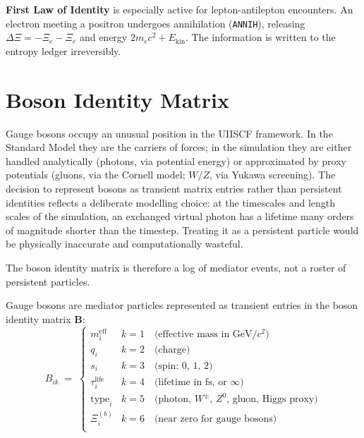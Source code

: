 \documentclass[11pt,a4paper]{article}
\newcommand{\Rec}{\Xi}
\begin{document}
\begin{smlaw}
\textbf{First Law of Identity} is especially active for lepton-antilepton
encounters.  An electron meeting a positron undergoes annihilation
(\texttt{ANNIH}), releasing $\Delta\Rec = -\Rec_e - \Rec_{\bar e}$ and
energy $2m_e c^2 + E_{\mathrm{kin}}$.  The information is written to the
entropy ledger irreversibly.
\end{smlaw}

\section{Boson Identity Matrix}\label{sec:boson}

Gauge bosons occupy an unusual position in the UIISCF framework.  In the
Standard Model they are the carriers of forces; in the simulation they are
either handled analytically (photons, via potential energy) or approximated
by proxy potentials (gluons, via the Cornell model; $W/Z$, via Yukawa
screening).  The decision to represent bosons as transient matrix entries
rather than persistent identities reflects a deliberate modelling choice:
at the timescales and length scales of the simulation, an exchanged virtual
photon has a lifetime many orders of magnitude shorter than the timestep.
Treating it as a persistent particle would be physically inaccurate and
computationally wasteful.

The boson identity matrix is therefore a log of mediator events, not a
roster of persistent particles.

Gauge bosons are mediator particles represented as transient entries in
the boson identity matrix $\mathbf{B}$:
\[
  B_{ik} \;=\;
  \begin{cases}
    m_i^{\mathrm{eff}} & k=1 \quad\text{(effective mass in GeV$/c^2$)} \\
    q_i               & k=2 \quad\text{(charge)} \\
    s_i               & k=3 \quad\text{(spin: 0, 1, 2)} \\
    \tau_i^{\mathrm{life}} & k=4 \quad\text{(lifetime in fs, or } \infty\text{)} \\
    \mathrm{type}_i   & k=5 \quad\text{(photon, $W^\pm$, $Z^0$, gluon, Higgs proxy)} \\
    \Rec_i^{(b)}       & k=6 \quad\text{(near zero for gauge bosons)} \\
  \end{cases}
\]
\end{document}
